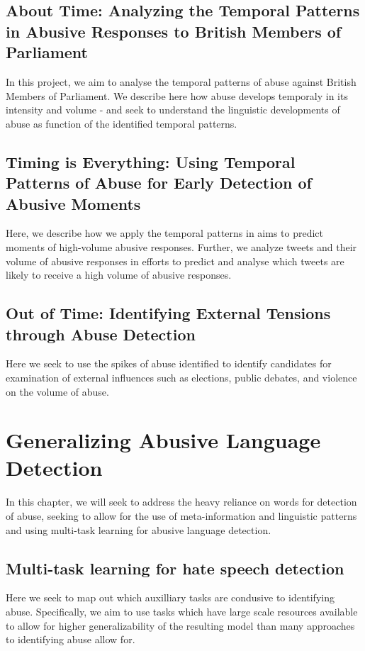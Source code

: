 \subsection{About Time: Analyzing the Temporal Patterns in Abusive Responses to British Members of Parliament}
In this project, we aim to analyse the temporal patterns of abuse against British Members of Parliament. We describe here how abuse develops temporaly in its intensity and volume - and seek to understand the linguistic developments of abuse as function of the identified temporal patterns.

\subsection{Timing is Everything: Using Temporal Patterns of Abuse for Early Detection of Abusive Moments}
Here, we describe how we apply the temporal patterns in aims to predict moments of high-volume abusive responses. Further, we analyze tweets and their volume of abusive responses in efforts to predict and analyse which tweets are likely to receive a high volume of abusive responses.

\subsection{Out of Time: Identifying External Tensions through Abuse Detection}

Here we seek to use the spikes of abuse identified to identify candidates for examination of external influences such as elections, public debates, and violence on the volume of abuse.


\section{Generalizing Abusive Language Detection}
In this chapter, we will seek to address the heavy reliance on words for detection of abuse, seeking to allow for the use of meta-information and linguistic patterns and using multi-task learning for abusive language detection.

\subsection{Multi-task learning for hate speech detection}
Here we seek to map out which auxilliary tasks are condusive to identifying abuse. Specifically, we aim to use tasks which have large scale resources available to allow for higher generalizability of the resulting model than many approaches to identifying abuse allow for.

